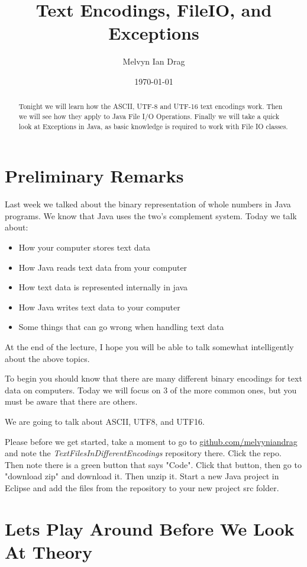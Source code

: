 \documentclass[12pt]{article}
\title{\Large Text Encodings, FileIO, and Exceptions }
\author{
	Melvyn Ian Drag
}
\date{\today}
\begin{document}
\maketitle

\begin{abstract}
Tonight we will learn how the ASCII, UTF-8 and UTF-16 text encodings work. Then we will see how they apply to Java File I/O Operations. Finally we will take a quick look at Exceptions in Java, as basic knowledge is required to work with File IO classes.
\end{abstract}

\section{Preliminary Remarks}
Last week we talked about the binary representation of whole numbers in Java
programs. We know that Java uses the two's complement system. Today we talk
about:
\begin{itemize}
\item How your computer stores text data
\item How Java reads text data from your computer
\item How text data is represented internally in java
\item How Java writes text data to your computer
\item Some things that can go wrong when handling text data
\end{itemize}

At the end of the lecture, I hope you will be able to talk somewhat
intelligently about the above topics.

To begin you should know that there are many different binary encodings for text
data on computers. Today we will focus on 3 of the more common ones, but you
must be aware that there are others.

We are going to talk about ASCII, UTF8, and UTF16.

Please before we get started, take a moment to go to
\url{github.com/melvyniandrag} and note the
\textit{TextFilesInDifferentEncodings} repository there. Click the repo. Then
note there is a green button that says "Code". Click that button, then go to
"download zip" and download it. Then unzip it. Start a new Java project in
Eclipse and add the files from the repository to your new project src folder.


\section{Lets Play Around Before We Look At Theory}
\end{document}
